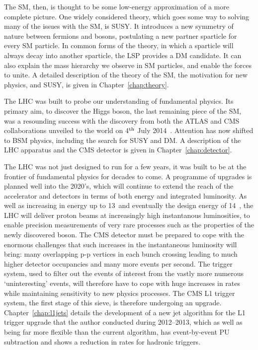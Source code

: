 The \ac{SM}, then, is thought to be some low-energy approximation of a more complete picture.
One widely considered theory, which goes some way to solving many of the issues with the \ac{SM}, is \ac{SUSY}.
It introduces a new symmetry of nature between fermions and bosons, postulating a new partner sparticle for every \ac{SM} particle. 
In common forms of the theory, in which a sparticle will always decay into another sparticle, the \ac{LSP} provides a \ac{DM} candidate. 
It can also explain the mass hierarchy we observe in \ac{SM} particles, and enable the forces to unite. 
A detailed description of the theory of the \ac{SM}, the motivation for new physics, and \ac{SUSY}, is given in Chapter~\ref{chap:theory}.

The LHC was built to probe our understanding of fundamental physics. 
Its primary aim, to discover the Higgs boson, the last remaining piece of the \ac{SM}, was a resounding success with the discovery from both the \ac{ATLAS} and \ac{CMS} collaborations unveiled to the world on 4$^{\rm th}$ July 2014~\cite{Aad:2012tfa,Chatrchyan:2012ufa}. 
Attention has now shifted to \ac{BSM} physics, including the search for \ac{SUSY} and \ac{DM}. 
A description of the LHC apparatus and the \ac{CMS} detector is given in Chapter~\ref{chap:detector}.

The LHC was not just designed to run for a few years, it was built to be at the frontier of fundamental physics for decades to come. 
A programme of upgrades is planned well into the 2020's, which will continue to extend the reach of the accelerator and detectors in terms of both energy and integrated luminosity. 
As well as increasing in energy up to 13~\TeV and eventually the design energy of 14~\TeV, the LHC will deliver proton beams at increasingly high instantanous luminosities, to enable precision measurements of very rare processes such as the properties of the newly discovered boson. 
The CMS detector must be prepared to cope with the enormous challenges that such increases in the instantaneous luminosity will bring: many overlapping p-p vertices in each bunch crossing leading to much higher detector occupancies and many more events per second. 
The trigger system, used to filter out the events of interest from the vastly more numerous `uninteresting' events, will therefore have to cope with huge increases in rates while maintaining sensitivity to new physics processes. 
The CMS \ac{L1} trigger system, the first stage of this sieve, is therefore undergoing an upgrade. 
Chapter~\ref{chap:l1jets} details the development of a new jet algorithm for the \ac{L1} trigger upgrade that the author conducted during 2012--2013, which as well as being far more flexible than the current algorithm, has event-by-event \ac{PU} subtraction and shows a reduction in rates for hadronic triggers.

